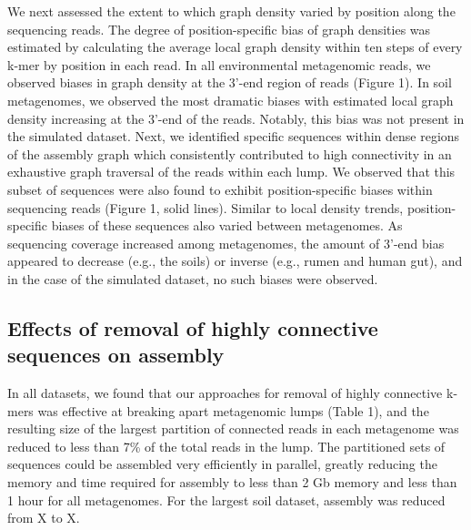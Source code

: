 \documentclass[11pt]{article} %
\begin{document}
We next assessed the extent to which graph density varied by position along the sequencing reads.  The degree of position-specific bias of graph densities was estimated by calculating the average local graph density within ten steps of every k-mer by position in each read.  In all environmental metagenomic reads, we observed biases in graph density at the 3'-end region of reads (Figure 1).  In soil metagenomes, we observed the most dramatic biases with estimated local graph density increasing at the 3'-end of the reads.  Notably, this bias was not present in the simulated dataset.  Next, we identified specific sequences within dense regions of the assembly graph which consistently contributed to high connectivity in an exhaustive graph traversal of the reads within each lump.  We observed that this subset of sequences were also found to exhibit position-specific biases within sequencing reads (Figure 1, solid lines).  Similar to local density trends, position-specific biases of these sequences also varied between metagenomes.  As sequencing coverage increased among metagenomes, the amount of 3'-end bias appeared to decrease (e.g., the soils) or inverse (e.g., rumen and human gut), and in the case of the simulated dataset, no such biases were observed.

\subsection{Effects of removal of highly connective sequences on assembly}

In all datasets, we found that our approaches for removal of highly connective k-mers was effective at breaking apart metagenomic lumps (Table 1), and the resulting size of the largest partition of connected reads in each metagenome was reduced to less than 7\% of the total reads in the lump.  The partitioned sets of sequences could be assembled very efficiently in parallel, greatly reducing the memory and time required for assembly to less than 2 Gb memory  and less than 1 hour  for all metagenomes.  For the largest soil dataset, assembly was reduced from X to X.   
\end{document}
